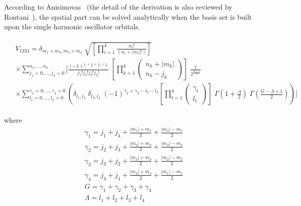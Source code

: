 According to Anisimovas~\cite{anisimovasMatulis} (the detail of the derivation is also reviewed by Rontani~\cite{RontaniThesis}), the spatial part can be solved analytically when the basis set is built upon the single harmonic oscillator orbitals.

\begin{align}
\begin{split}
& V_{1234}= \delta_{m_1+m_2,m_3+m_4} \; \sqrt{ \left[ \prod_{i=1}^4 \frac{n_i !}{(n_i+|m_i|!)} \right] } \\
&\times \sum_{j_1=0,\dots,j_4=0}^{n_1,\dots,n_4} \Bigg[ \frac{(-1)^{j_1+j_2+j_3+j_4}} {j_1!j_2!j_3!j_4!} \; \left[ \prod_{k=1}^4 \begin{pmatrix} n_k+|m_k|\\n_k-j_k\end{pmatrix}  \right]  \; \frac{1}{2^{\frac{G+1}{2}}}   \\
&\times  \sum_{l_1=0,\dots,l_4=0}^{\gamma_1=0,\dots,\gamma_4=0} \left( \delta_{l_1,l_2} \; \delta_{l_3,l_4} \; (-1)^{\gamma_2+\gamma_3-l_2-l_3} \left[ \prod_{t=1}^4 \begin{pmatrix} \gamma_t\\l_t\end{pmatrix} \right] \; \Gamma \left(1+\frac{\Lambda}{2} \right) \; \Gamma \left(\frac{G - \Lambda +1}{2}\right)    \right)  \Bigg]
\end{split}
\end{align} 

where
\begin{align*}
&\gamma_1=j_1+j_4+\frac{|m_1|+m_1}{2}+\frac{|m_4|-m_4}{2} \\
&\gamma_2=j_2+j_3+\frac{|m_2|+m_2}{2}+\frac{|m_3|-m_3}{2} \\
&\gamma_3=j_3+j_2+\frac{|m_3|+m_3}{2}+\frac{|m_2|-m_2}{2} \\
&\gamma_4=j_4+j_1+\frac{|m_4|+m_4}{2}+\frac{|m_1|-m_1}{2} \\
&G=\gamma_1+\gamma_2+\gamma_3+\gamma_4 \\
&\Lambda = l_1 +l_2+l_3 +l_4
\end{align*}



